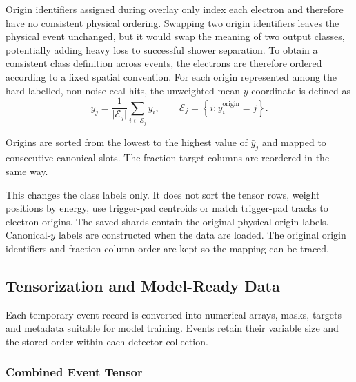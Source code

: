 Origin identifiers assigned during overlay only index each electron and therefore have no consistent physical ordering. Swapping two origin identifiers leaves the physical event unchanged, but it would swap the meaning of two output classes, potentially adding heavy loss to successful shower separation. To obtain a
consistent class definition across events, the electrons are therefore ordered
according to a fixed spatial convention. For each origin represented among
the hard-labelled, non-noise \gls{ecal} hits, the unweighted mean
\(y\)-coordinate is defined as
\begin{equation}
    \bar y_j =
    \frac{1}{\lvert \mathcal{E}_j\rvert}
    \sum_{i\in\mathcal{E}_j} y_i,
    \qquad
    \mathcal{E}_j =
    \left\{i:y_i^{\mathrm{origin}}=j\right\}.
\end{equation}

Origins are sorted from the lowest to the highest value of \(\bar y_j\) and
mapped to consecutive canonical slots. The fraction-target columns are
reordered in the same way.

This changes the class labels only. It does not sort the tensor rows, weight
positions by energy, use trigger-pad centroids or match trigger-pad tracks to
electron origins. The saved shards contain the original physical-origin
labels. Canonical-\(y\) labels are constructed when the data are loaded. The
original origin identifiers and fraction-column order are kept so the mapping
can be traced.

\subsection{Tensorization and Model-Ready Data}
\label{sec:method_features}

Each temporary event record is converted into numerical arrays, masks, targets
and metadata suitable for model training. Events retain their variable size
and the stored order within each detector collection.

\subsubsection{Combined Event Tensor}

